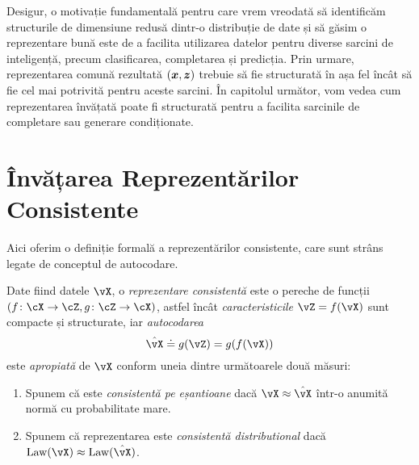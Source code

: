 \documentclass[../../book-main_ro.tex]{subfiles}
\begin{document}
Desigur, o motivație fundamentală pentru care vrem vreodată să identificăm
structurile de dimensiune redusă dintr-o distribuție de date și să găsim o reprezentare
bună este de a facilita utilizarea datelor pentru diverse sarcini
de inteligență, precum clasificarea, completarea și predicția.
Prin urmare, reprezentarea comună rezultată $(\bm{x}, \bm{z})$ trebuie să fie
structurată în așa fel încât să fie cel mai potrivită pentru aceste sarcini. În
capitolul următor, vom
vedea cum reprezentarea învățată poate fi structurată pentru a facilita
sarcinile de completare sau generare condiționate.

\section{Învățarea Reprezentărilor Consistente}\label{sec:consistent-representation}

Aici oferim o definiție formală a reprezentărilor consistente, care
sunt strâns legate de conceptul de autocodare.
\begin{definition}\label{def:bidirectional_rep}
  Date fiind datele \(\vX\), o \textit{reprezentare consistentă} este o pereche
  de funcții \((f \colon \cX \to \cZ, g \colon \cZ \to \cX)\), astfel
  încât \textit{caracteristicile} \(\vZ = f(\vX)\) sunt compacte și
  structurate, iar \textit{autocodarea}
  \begin{equation}
    \hat{\vX} \doteq g(\vZ) = g(f(\vX))
  \end{equation}
  este \textit{apropiată} de \(\vX\) conform uneia dintre
  următoarele două măsuri:
  \begin{enumerate}
    \item Spunem că este \textit{consistentă pe eșantioane} dacă \(\vX
      \approx \hat{\vX}\) într-o anumită normă cu probabilitate mare.
    \item Spunem că reprezentarea este \textit{consistentă
      distributional} dacă \(\Law(\vX) \approx \Law(\hat{\vX})\).
  \end{enumerate}
\end{definition}
\end{document}
